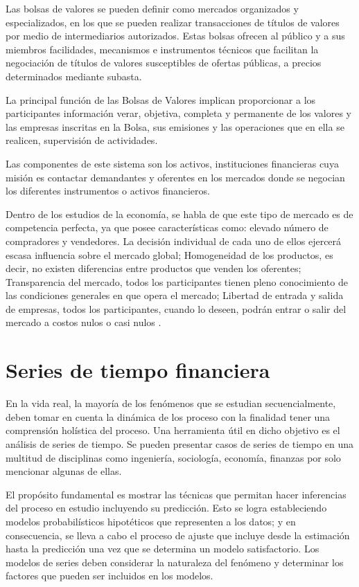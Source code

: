 Las bolsas de valores se pueden definir como mercados organizados y especializados, en los que se pueden realizar transacciones de títulos de valores por
medio de intermediarios autorizados. Estas bolsas ofrecen al público y a sus miembros facilidades, mecanismos e instrumentos técnicos que facilitan la negociación
de títulos de valores susceptibles de ofertas públicas, a precios determinados mediante subasta.

La principal función de las Bolsas de Valores implican proporcionar a los participantes información verar, objetiva, completa y permanente de los valores
y las empresas inscritas en la Bolsa, sus emisiones y las operaciones que en ella se realicen, supervisión de actividades.

Las componentes de este sistema son los activos, instituciones financieras cuya misión es contactar demandantes y oferentes en los mercados donde se negocian
los diferentes instrumentos o activos financieros.

Dentro de los estudios de la economía, se habla de que este tipo de mercado es de competencia perfecta, ya que posee características
como: elevado número de compradores y vendedores. La decisión individual de cada uno de ellos ejercerá escasa influencia sobre el mercado global; 
Homogeneidad de los productos, es decir, no existen diferencias entre productos que venden los oferentes; Transparencia del mercado, todos los 
participantes tienen pleno conocimiento de las condiciones generales en que opera el mercado; Libertad de entrada y salida de empresas, todos 
los participantes, cuando lo deseen, podrán entrar o salir del mercado a costos nulos o casi nulos \cite{mankiw2011principles}.

\section{Series de tiempo financiera}

En la vida real, la mayoría de los fenómenos que se estudian secuencialmente, deben
tomar en cuenta la dinámica de los proceso con la finalidad tener una comprensión holística del proceso.
Una herramienta útil en dicho objetivo es el análisis de series de tiempo. Se
pueden presentar casos de series de tiempo en una multitud de disciplinas como ingeniería,
sociología, economía, finanzas por solo mencionar algunas de ellas.

El propósito fundamental es mostrar las técnicas que permitan hacer inferencias del
proceso en estudio incluyendo su predicción. Esto se logra estableciendo modelos
probabilísticos hipotéticos que representen a los datos; y en consecuencia, se lleva a cabo el
proceso de ajuste que incluye desde la estimación hasta la predicción una vez que se determina
un modelo satisfactorio. Los modelos de series deben considerar la naturaleza del fenómeno y determinar 
los factores que pueden ser incluidos en los modelos.

